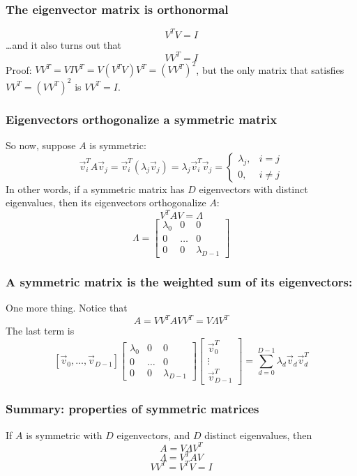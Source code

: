 \documentclass{beamer}
\begin{document}
\begin{frame}
  \frametitle{The eigenvector matrix is orthonormal}
  \[
  V^TV = I
  \]
  \ldots and it also turns out that
  \[
  VV^T = I
  \]
  Proof: 
  $VV^T=VIV^T=V(V^TV)V^T=(VV^T)^2$, but the only matrix that satisfies
  $VV^T=(VV^T)^2$ is $VV^T=I$.
\end{frame}

\begin{frame}
  \frametitle{Eigenvectors orthogonalize a symmetric matrix}
  So now, suppose $A$ is symmetric:
  \[
  \vec{v}_i^TA\vec{v}_j=
  \vec{v}_i^T(\lambda_j\vec{v}_j)=\lambda_j\vec{v}_i^T\vec{v}_j
  =\begin{cases}\lambda_j,&i=j\\0,&i\ne j\end{cases}
  \]
  In other words, if a symmetric matrix has $D$ eigenvectors with
  distinct eigenvalues, then its eigenvectors orthogonalize $A$:
  \[
  V^TAV = \Lambda
  \]
  \[
  \Lambda=
  \left[\begin{array}{ccc}\lambda_0&0&0\\0&\ldots&0\\0&0&\lambda_{D-1}\end{array}\right]
  \]
\end{frame}

\begin{frame}
  \frametitle{A symmetric matrix is the weighted sum of its eigenvectors:}
  One more thing.  Notice that
  \[
  A = VV^TAVV^T =V\Lambda V^T
  \]
  The last term is
  \[
  \left[\vec{v}_0,\ldots,\vec{v}_{D-1}\right]
  \left[\begin{array}{ccc}\lambda_0&0&0\\0&\ldots&0\\0&0&\lambda_{D-1}\end{array}\right]  
  \left[\begin{array}{c}\vec{v}_0^T\\\vdots\\\vec{v}_{D-1}^T\end{array}\right]=
  \sum_{d=0}^{D-1}\lambda_d \vec{v}_d\vec{v}_d^T
  \]
\end{frame}

\begin{frame}
  \frametitle{Summary: properties of symmetric matrices}
  If $A$ is symmetric with $D$ eigenvectors, and $D$ distinct eigenvalues, then
  \[
  A=V\Lambda V^T
  \]
  \[
  \Lambda = V^TAV
  \]
  \[
  VV^T=V^TV=I
  \]
\end{frame}
\end{document}
